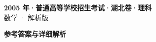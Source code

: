\documentclass[zihao=-4, a4paper]{ctexart}
\begin{document}
\begin{center}
  {\Large\bfseries 2005 年·普通高等学校招生考试·湖北卷·理科}\\[4pt]
  {\large 数学 · 解析版}
\end{center}
\medskip
{}

\clearpage
{}
\begin{center}{\Large\bfseries 参考答案与详细解析}\end{center}
\medskip

\end{document}
